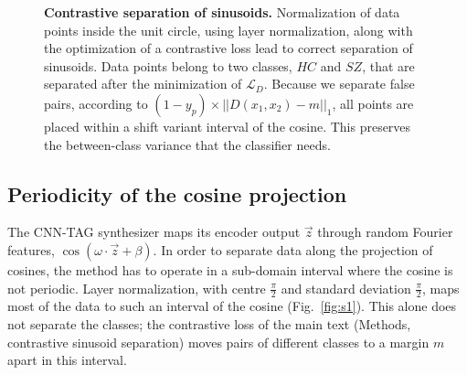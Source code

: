 \documentclass[10pt]{article}
\begin{document}
\begin{figure}[ht]
\begin{tikzpicture}
        
    \end{tikzpicture}
    \caption{\textbf{Contrastive separation of sinusoids.} Normalization of data points inside the unit circle, using layer normalization, along with the optimization of a contrastive loss lead to correct separation of sinusoids. Data points belong to two classes, $HC$ and $SZ$, that are separated after the minimization of $\mathcal{L}_D$. Because we separate false pairs, according to $(1-y_p) \times ||D(x_1,x_2)-m||_1$, all points are placed within a shift variant interval of the cosine. This preserves the between-class variance that the classifier needs.}
    \label{fig:sinusoid_separation}
\end{figure}

\subsection*{Periodicity of the cosine projection}

The CNN-TAG synthesizer maps its encoder output $\vec{z}$ through random Fourier features, $\cos(\omega\cdot\vec{z}+\beta)$. In order to separate data along the projection of cosines, the method has to operate in a sub-domain interval where the cosine is not periodic. Layer normalization, with centre $\frac{\pi}{2}$ and standard deviation $\frac{\pi}{2}$, maps most of the data to such an interval of the cosine (Fig.~\ref{fig:s1}). This alone does not separate the classes; the contrastive loss of the main text (Methods, contrastive sinusoid separation) moves pairs of different classes to a margin $m$ apart in this interval.
\end{document}
